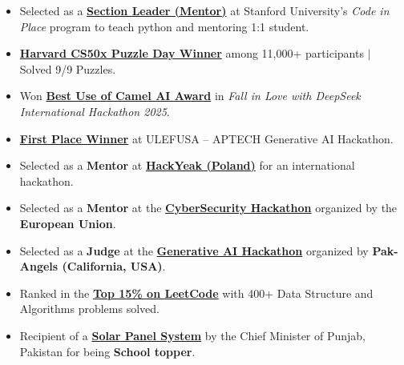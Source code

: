\documentclass[a4paper,12pt]{article}
\begin{document}
\begin{itemize}[leftmargin=*]
    \item Selected as a \href{https://digitalcredential.stanford.edu/check/FA458483850B4B635DD0915130CCBEBF00F195AFCBF6991EE7448725533BAAB2LzFqZHI1YU9SSmVRZFpMQjVXV0xjdkxuWktYOExkU2RBZE85SFF6YmlPZGZLZDA0}{\textbf{Section Leader (Mentor)}} at Stanford University’s \textit{Code in Place} program to teach python and mentoring 1:1 student.
    \item \href{https://www.linkedin.com/posts/muhammad-qasim-gill_cs50-harvard-puzzleday2025-activity-7316559580790972418-4B6G?utm_source=share&utm_medium=member_desktop&rcm=ACoAACG6gOwBnlfoWP0KSUXYMZV0hE4WXwmWsBQ}{\textbf{Harvard CS50x Puzzle Day Winner}} among 11,000+ participants $|$ Solved 9/9 Puzzles.
    \item Won \href{https://lablab.ai/event/fall-in-love-with-deepseek/shallowseekers/ai-powered-personal-finance-assistant}{\textbf{Best Use of Camel AI Award}} in \textit{Fall in Love with DeepSeek International Hackathon 2025}.
    \item \href{https://www.linkedin.com/posts/muhammad-qasim-gill_celebrating-the-top-10-hackathon-winners-activity-7304649229472309248--oea?utm_source=share&utm_medium=member_desktop&rcm=ACoAACG6gOwBnlfoWP0KSUXYMZV0hE4WXwmWsBQ}{\textbf{First Place Winner}} at ULEFUSA – APTECH Generative AI Hackathon.
    \item Selected as a \textbf{Mentor} at \href{https://2025.hackyeah.pl/bio_mentor_2025/#id=60630}{\textbf{HackYeak (Poland)}} for an international hackathon.
    \item Selected as a \textbf{Mentor} at the \href{https://drive.google.com/file/d/1HdK8eSl7OtU3rPIkfh5ytRqUkZE4SsNM/view?usp=sharing}{\textbf{CyberSecurity Hackathon}} organized by the \textbf{European Union}.
    \item Selected as a \textbf{Judge} at the \href{https://www.linkedin.com/company/pakangels/posts/}{\textbf{Generative AI Hackathon}} organized by \textbf{Pak-Angels (California, USA)}.
    \item Ranked in the \href{https://leetcode.com/u/MuhammadQasim007/}{\textbf{Top 15\% on LeetCode}} with 400+ Data Structure and Algorithms problems solved.
    \item Recipient of a \href{https://drive.google.com/file/d/1RJtZZy4bmxIHsum4lScyPMozND_tC72V/view?usp=sharing}{\textbf{Solar Panel System}} by the Chief Minister of Punjab, Pakistan for being \textbf{School topper}.

\end{itemize}
\end{document}

